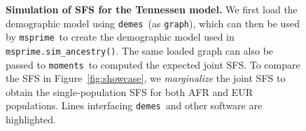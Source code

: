 \documentclass[11pt]{article}
\newcommand{\msprime}[0]{\texttt{msprime}}
\newcommand{\demes}[0]{\texttt{demes}}
\newcommand{\moments}[0]{\texttt{moments}}
\begin{document}
\begin{figure}[h!]
    \begin{tcolorbox}
        \inputminted[fontsize=\scriptsize,linenos,numbersep=5pt,highlightlines={9,19,52}]{python}{models/tennessen-simulation.py}
    \end{tcolorbox}
    \caption{
        \textbf{Simulation of SFS for the Tennessen model.}
        We first load the demographic model using \demes\ (as \texttt{graph}),
        which can then be used by \msprime\ to create the demographic model used in
        \texttt{msprime.sim\_ancestry()}. The same loaded graph can also be
        passed to \moments\ to computed the expected joint SFS.
        To compare the SFS in Figure~\ref{fig:showcase}, we \emph{marginalize} the
        joint SFS to obtain the single-population SFS for both AFR and EUR populations.
        Lines interfacing \demes\ and other software are highlighted.
    }
    \label{fig:tennessen-simulation}
\end{figure}
\end{document}
